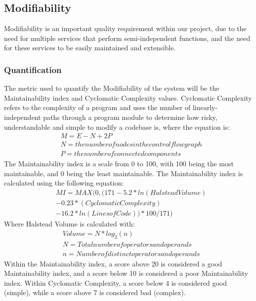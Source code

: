 \documentclass[12pt]{article}
\begin{document}
\newpage
\subsection{Modifiability}
Modifiability is an important quality requirement within our project, due to the need for multiple services that perform semi-independent functions, and the need for these services to be easily maintained and extensible.
\subsubsection{Quantification}
The metric used to quantify the Modifiability of the system will be the Maintainability index and Cyclomatic Complexity values. Cyclomatic Complexity refers to the complexity of a program and uses the number of linearly-independent paths through a program module to determine how risky, understandable and simple to modify a codebase is, where the equation is:
\begin{equation}
    \begin{aligned}
         & M = E - N + 2P                                    \\
         & N = the number of nodes in the control flow graph \\
         & P = the number of connected components
    \end{aligned}
\end{equation}
The Maintainability index is a scale from 0 to 100, with 100 being the most maintainable, and 0 being the least maintainable. The Maintainability index is calculated using the following equation:
\begin{equation}
    \begin{aligned}
         & MI = MAX(0, (171 - 5.2 * ln(Halstead Volume) \\
         & - 0.23 * (Cyclomatic Complexity)             \\
         & - 16.2 * ln(Lines of Code)) * 100 / 171)
    \end{aligned}
\end{equation}
Where Halstead Volume is calculated with:
\begin{equation}
    \begin{aligned}
         & Volume = N * log_2(n)                         \\
         & N = Total number of operators and operands    \\
         & n = Number of distinct operators and operands
    \end{aligned}
\end{equation}
Within the Maintainability index, a score above 20 is considered a good Maintainability index, and a score below 10 is considered a poor Maintainability index.
Within Cyclomatic Complexity, a score below 4 is considered good (simple), while a score above 7 is considered bad (complex).
\end{document}
